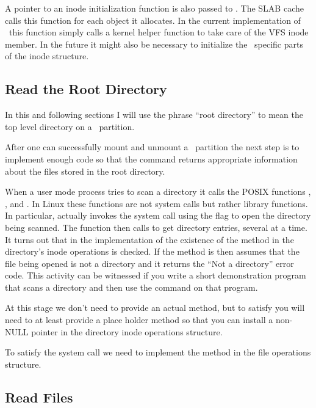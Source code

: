 A pointer to an inode initialization function  is also passed to
. The SLAB cache calls this function for each object it allocates. In
the current implementation of \GenericFS\ this function simply calls a kernel helper function
 to take care of the VFS inode member. In the future it might also be
necessary to initialize the \GenericFS\ specific parts of the inode structure.

\subsection{Read the Root Directory}
\label{sec:implementation-readroot}

In this and following sections I will use the phrase ``root directory'' to mean the top level
directory on a \GenericFS\ partition.

After one can successfully mount and unmount a \GenericFS\ partition the next step is to
implement enough code so that the command  returns appropriate information about
the files stored in the root directory.

When a user mode process tries to scan a directory it calls the POSIX functions ,
, and . In Linux these functions are not system calls but rather
library functions. In particular,  actually invokes the  system call
using the  flag to open the directory being scanned. The 
function then calls  to get directory entries, several at a time. It turns out
that in the implementation of  the existence of the  method in the
directory's inode operations is checked. If the method is  then  assumes
that the file being opened is not a directory and it returns the ``Not a directory'' error code.
This activity can be witnessed if you write a short demonstration program that scans a directory
and then use the  command on that program.

At this stage we don't need to provide an actual  method, but to satisfy
 you will need to at least provide a place holder method so that you can install a
non-NULL pointer in the directory inode operations structure.

To satisfy the  system call we need to implement the  method in the
file operations structure.

\subsection{Read Files}
\label{sec-implementation-readfiles}

